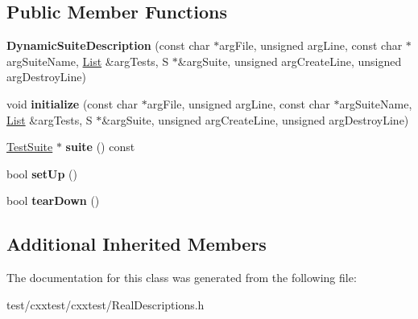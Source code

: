 \subsection*{Public Member Functions}
\begin{DoxyCompactItemize}
\item 
\hypertarget{classCxxTest_1_1DynamicSuiteDescription_ab325f0a2e81ebbb6719f780d75471883}{{\bfseries Dynamic\-Suite\-Description} (const char $\ast$arg\-File, unsigned arg\-Line, const char $\ast$arg\-Suite\-Name, \hyperlink{structCxxTest_1_1List}{List} \&arg\-Tests, S $\ast$\&arg\-Suite, unsigned arg\-Create\-Line, unsigned arg\-Destroy\-Line)}\label{classCxxTest_1_1DynamicSuiteDescription_ab325f0a2e81ebbb6719f780d75471883}

\item 
\hypertarget{classCxxTest_1_1DynamicSuiteDescription_a0f426c051f5ccaf14ebbd11c07329e57}{void {\bfseries initialize} (const char $\ast$arg\-File, unsigned arg\-Line, const char $\ast$arg\-Suite\-Name, \hyperlink{structCxxTest_1_1List}{List} \&arg\-Tests, S $\ast$\&arg\-Suite, unsigned arg\-Create\-Line, unsigned arg\-Destroy\-Line)}\label{classCxxTest_1_1DynamicSuiteDescription_a0f426c051f5ccaf14ebbd11c07329e57}

\item 
\hypertarget{classCxxTest_1_1DynamicSuiteDescription_a524a9a8981a9c58aa09023d3bfba4dee}{\hyperlink{classCxxTest_1_1TestSuite}{Test\-Suite} $\ast$ {\bfseries suite} () const }\label{classCxxTest_1_1DynamicSuiteDescription_a524a9a8981a9c58aa09023d3bfba4dee}

\item 
\hypertarget{classCxxTest_1_1DynamicSuiteDescription_a0cee600a803f0accaaa82a1e933d2266}{bool {\bfseries set\-Up} ()}\label{classCxxTest_1_1DynamicSuiteDescription_a0cee600a803f0accaaa82a1e933d2266}

\item 
\hypertarget{classCxxTest_1_1DynamicSuiteDescription_a322a0b084882a891bc8cf12805a56f12}{bool {\bfseries tear\-Down} ()}\label{classCxxTest_1_1DynamicSuiteDescription_a322a0b084882a891bc8cf12805a56f12}

\end{DoxyCompactItemize}
\subsection*{Additional Inherited Members}


The documentation for this class was generated from the following file\-:\begin{DoxyCompactItemize}
\item 
test/cxxtest/cxxtest/Real\-Descriptions.\-h\end{DoxyCompactItemize}
